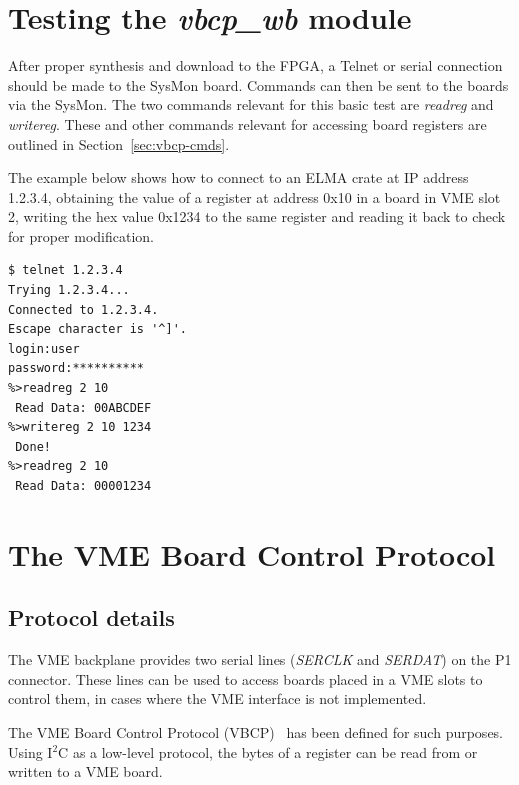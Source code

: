 \documentclass[a4paper,11pt]{article}
\begin{document}
\section{Testing the \textit{vbcp\_wb} module}
\label{sec:testing}

After proper synthesis and download to the FPGA, a Telnet or serial connection
should be made to the SysMon board. Commands can then be sent to the boards via
the SysMon. The two commands relevant for this basic test are \textit{readreg}
and \textit{writereg}. These and other commands relevant for accessing board
registers are outlined in Section~\ref{sec:vbcp-cmds}.

The example below shows how to connect to an ELMA crate at IP address 1.2.3.4,
obtaining the value of a register at address 0x10 in a board in VME slot 2,
writing the hex value 0x1234 to the same register and reading it back to check for
proper modification.

\pagebreak
\begin{verbatim}
$ telnet 1.2.3.4
Trying 1.2.3.4...
Connected to 1.2.3.4.
Escape character is '^]'.
login:user
password:**********
%>readreg 2 10
 Read Data: 00ABCDEF
%>writereg 2 10 1234
 Done!
%>readreg 2 10
 Read Data: 00001234
\end{verbatim}

\section{The VME Board Control Protocol}
\label{sec:vbcp}

\subsection{Protocol details}
\label{sec:vbcp-prot}

The VME backplane provides two serial lines (\textit{SERCLK} and \textit{SERDAT})
on the P1 connector. These lines can be used to access boards placed in a VME
slots to control them, in cases where the VME interface is not implemented.

The VME Board Control Protocol (VBCP)~\cite{sysmon-i2c} has been defined for such
purposes. Using I$^2$C as a low-level protocol, the bytes of a register can be read
from or written to a VME board.
\end{document}
